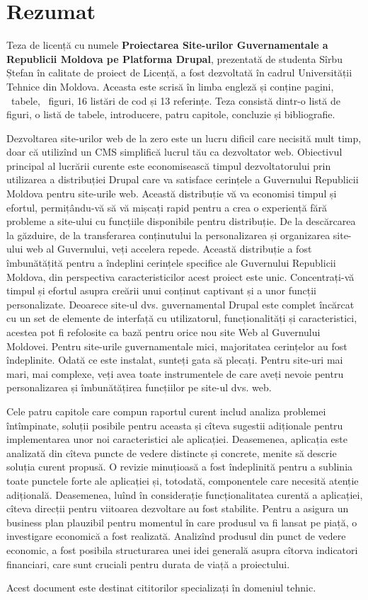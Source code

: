 \section*{Rezumat}
Teza de licență cu numele \textbf{Proiectarea Site-urilor Guvernamentale a Republicii Moldova pe Platforma Drupal}, prezentată de studenta Sîrbu Ștefan în calitate de proiect de Licență, a fost dezvoltată în cadrul Universității Tehnice din Moldova. Aceasta este scrisă în limba engleză și conține  \pageref{LastPage} pagini, \totaltables\ tabele, \totalfigures\ figuri, 16 listări de cod și 13 referințe. Teza consistă dintr-o listă de figuri, o listă de tabele, introducere, patru capitole, concluzie și bibliografie.

Dezvoltarea site-urilor web de la zero este un lucru dificil care necisită mult timp, doar că utilizînd un CMS simplifică lucrul tău ca dezvoltator web. Obiectivul principal al lucrării curente este economisească timpul dezvoltatorului prin utilizarea a distribuției Drupal care va satisface cerințele a Guvernului Republicii Moldova pentru site-urile web. Această distribuție vă va economisi timpul și efortul, permițându-vă să vă mișcați rapid pentru a crea o experiență fără probleme a site-ului cu funcțiile disponibile pentru distribuție. De la descărcarea la găzduire, de la transferarea conținutului la personalizarea și organizarea site-ului web al Guvernului, veți accelera repede. Această distribuție a fost îmbunătățită pentru a îndeplini cerințele specifice ale Guvernului Republicii Moldova, din perspectiva caracteristicilor acest proiect este unic. Concentrați-vă timpul și efortul asupra creării unui conținut captivant și a unor funcții personalizate. Deoarece site-ul dvs. guvernamental Drupal este complet încărcat cu un set de elemente de interfață cu utilizatorul, funcționalități și caracteristici, acestea pot fi refolosite ca bază pentru orice nou site Web al Guvernului Moldovei. Pentru site-urile guvernamentale mici, majoritatea cerințelor au fost îndeplinite. Odată ce este instalat, sunteți gata să plecați. Pentru site-uri mai mari, mai complexe, veți avea toate instrumentele de care aveți nevoie pentru personalizarea și îmbunătățirea funcțiilor pe site-ul dvs. web.

Cele patru capitole care compun raportul curent includ analiza problemei întîmpinate, soluții posibile pentru aceasta și cîteva sugestii adiționale pentru implementarea unor noi caracteristici ale aplicației. Deasemenea, aplicația este analizată din cîteva puncte de vedere distincte și concrete, menite să descrie soluția curent propusă. O revizie minuțioasă a fost îndeplinită pentru a sublinia toate punctele forte ale aplicației și, totodată, componentele care necesită atenție adițională. Deasemenea, luînd în considerație funcționalitatea curentă a aplicației, cîteva direcții pentru viitoarea dezvoltare au fost stabilite. Pentru a asigura un business plan plauzibil pentru momentul în care produsul va fi lansat pe piață, o investigare economică a fost realizată. Analizînd produsul din punct de vedere economic, a fost posibila structurarea unei  idei generală asupra cîtorva indicatori financiari, care sunt cruciali pentru durata de viață a proiectului.

Acest document este destinat cititorilor specializați în domeniul tehnic.



